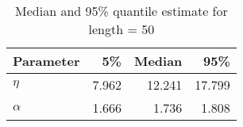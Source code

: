 \begin{table}[ht]
\centering
\begin{tabular}{lrrr}
  \hline
Parameter & 5\% & Median & 95\% \\ 
  \hline
$\eta$ & 7.962 & 12.241 & 17.799 \\ 
  $\alpha$ & 1.666 & 1.736 & 1.808 \\ 
   \hline
\end{tabular}
\caption{Median and 95\% quantile estimate for length = 50} 
\end{table}
